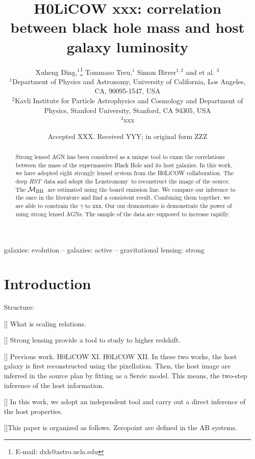 \documentclass[fleqn,usenatbib]{mnras}
\title[lens source reconstruction]{H0LiCOW xxx: correlation between black hole mass and host galaxy luminosity}
\author[X. Ding et al.]{
Xuheng Ding,$^{1}$\thanks{E-mail: dxh@astro.ucla.edu}
Tommaso Treu,$^{1}$
Simon Birrer$^{1, 2}$
and et al. $^{3}$
\\
$^{1}$Department of Physics and Astronomy, University of California, Los Angeles, CA, 90095-1547, USA\\
$^{2}$Kavli Institute for Particle Astrophysics and Cosmology and Department of Physics, Stanford University, Stanford, CA 94305, USA\\
$^{3}$xxx
}
\date{Accepted XXX. Received YYY; in original form ZZZ}
\newcommand{\hst}{{\it HST}}
\newcommand{\mbh}{$\mathcal M_{\rm BH}$}
\newcommand{\lenstronomy}{{\sc Lenstronomy}}
\begin{document}
\label{firstpage}
\pagerange{\pageref{firstpage}--\pageref{lastpage}}
\maketitle

\begin{abstract}
Strong lensed AGN has been considered as a unique tool to exam the correlations between the mass of the supermassive Black Hole and its host galaxies. In this work, we have adopted eight strongly lensed system from the H0LiCOW collaboration. The deep \hst\ data and adopt the \lenstronomy\ to reconstruct the image of the source. The \mbh\ are estimated using the board emission line. We compare our inference to the once in the literature and find a consistent result. Combining them together, we are able to constrain the $\gamma$ to xxx. Our our demonstrate is demonstrate the power of using strong lensed AGNs. The sample of the data are supposed to increase rapidly.
\end{abstract}

\begin{keywords}
galaxies: evolution -- galaxies: active -- gravitational lensing: strong
\end{keywords}



\section{Introduction}
Structure:

[] What is scaling relations.

[] Strong lensing provide a tool to study to higher redshift.

[] Previous work. H0LiCOW XI. H0LiCOW XII. In these two works, the host galaxy is first reconstructed using the pixellation. Then, the host image are inferred in the source plan by fitting as a Sersic model. This means, the two-step inference of the host information. 

[] In this work, we adopt an independent tool and carry out a direct inference of the host properties. 

[]This paper is organized as follows. Zeropoint are defined in the AB systems.
\end{document}
